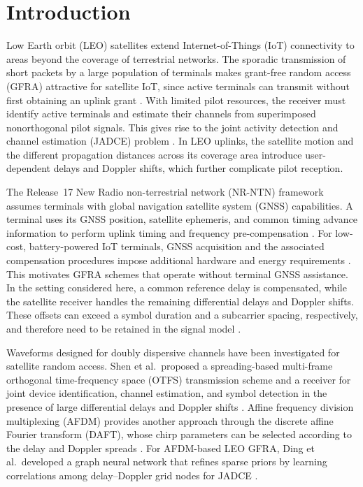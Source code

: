 \section{Introduction}
\label{sec:introduction}

Low Earth orbit (LEO) satellites extend Internet-of-Things (IoT)
connectivity to areas beyond the coverage of terrestrial networks.
The sporadic transmission of short packets by a large population of
terminals makes grant-free random access (GFRA) attractive for satellite
IoT, since active terminals can transmit without first obtaining an
uplink grant \cite{shen2025}. With limited pilot resources, the receiver
must identify active terminals and estimate their channels from
superimposed nonorthogonal pilot signals. This gives rise to the joint
activity detection and channel estimation (JADCE) problem
\cite{liu2018}. In LEO uplinks, the satellite motion and the different
propagation distances across its coverage area introduce user-dependent
delays and Doppler shifts, which further complicate pilot reception.

The Release~17 New Radio non-terrestrial network (NR-NTN) framework
assumes terminals with global navigation satellite system (GNSS)
capabilities. A terminal uses its GNSS position, satellite ephemeris,
and common timing advance information to perform uplink timing and
frequency pre-compensation \cite[Secs.~16.14.1 and 16.14.2.2]{3gpp38300}.
For low-cost, battery-powered IoT terminals, GNSS acquisition and the
associated compensation procedures impose additional hardware and
energy requirements \cite{shen2025}. This motivates GFRA schemes that
operate without terminal GNSS assistance. In the setting considered
here, a common reference delay is compensated, while the satellite
receiver handles the remaining differential delays and Doppler shifts.
These offsets can exceed a symbol duration and a subcarrier spacing,
respectively, and therefore need to be retained in the signal model
\cite{shen2025}.

Waveforms designed for doubly dispersive channels have been investigated
for satellite random access. Shen et al.\ proposed a spreading-based
multi-frame orthogonal time-frequency space (OTFS) transmission scheme
and a receiver for joint device identification, channel estimation, and
symbol detection in the presence of large differential delays and
Doppler shifts \cite{shen2025}. Affine frequency division multiplexing
(AFDM) provides another approach through the discrete affine Fourier
transform (DAFT), whose chirp parameters can be selected according to
the delay and Doppler spreads \cite{bemani2022}. For AFDM-based LEO
GFRA, Ding et al.\ developed a graph neural network that refines sparse
priors by learning correlations among delay--Doppler grid nodes
for JADCE \cite{ding2026}.

